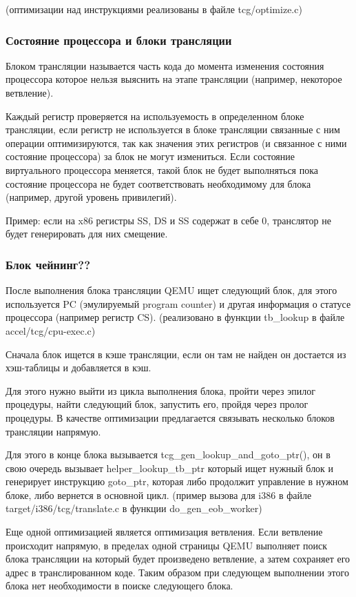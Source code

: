 (оптимизации над инструкциями реализованы в файле tcg/optimize.c)

\subsubsection{Состояние процессора и блоки трансляции}

Блоком трансляции называется часть кода до момента изменения состояния процессора которое нельзя выяснить на этапе трансляции (например, некоторое ветвление).

Каждый регистр проверяется на используемость в определенном блоке трансляции, если регистр не используется в блоке трансляции связанные с ним операции оптимизируются, так как значения этих регистров (и связанное с ними состояние процессора) за блок не могут измениться. Если состояние виртуального процессора меняется, такой блок не будет выполняться пока состояние процессора не будет соответствовать необходимому для блока (например, другой уровень привилегий).

Пример: если на x86 регистры SS, DS и SS содержат в себе 0, транслятор не будет генерировать для них смещение.

\subsubsection{Блок чейнинг??}

После выполнения блока трансляции QEMU ищет следующий блок, для этого используется PC (эмулируемый program counter) и другая информация о статусе процессора (например регистр CS). (реализовано в функции tb\_lookup в файле accel/tcg/cpu-exec.c)

Сначала блок ищется в кэше трансляции, если он там не найден он достается из хэш-таблицы и добавляется в кэш.

Для этого нужно выйти из цикла выполнения блока, пройти через эпилог процедуры, найти следующий блок, запустить его, пройдя через пролог процедуры. В качестве оптимизации предлагается связывать несколько блоков трансляции напрямую.

Для этого в конце блока вызывается tcg\_gen\_lookup\_and\_goto\_ptr(), он в свою очередь вызывает helper\_lookup\_tb\_ptr который ищет нужный блок и генерирует инструкцию goto\_ptr, которая либо продолжит управление в нужном блоке, либо вернется в основной цикл. (пример вызова для i386 в файле target/i386/tcg/translate.c в функции do\_gen\_eob\_worker)

Еще одной оптимизацией является оптимизация ветвления. Если ветвление происходит напрямую, в пределах одной страницы QEMU выполняет поиск блока трансляции на который будет произведено ветвление, а затем сохраняет его адрес в транслированном коде. Таким образом при следующем выполнении этого блока нет необходимости в поиске следующего блока.

